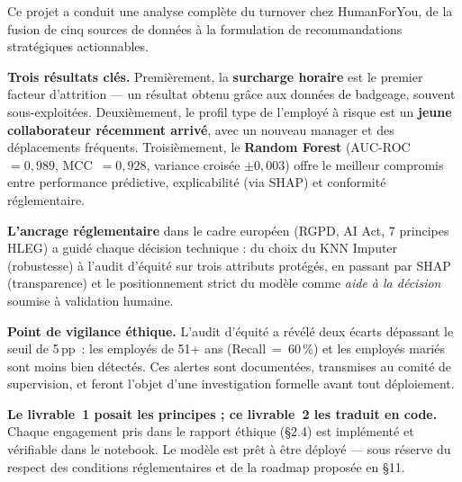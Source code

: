 \documentclass[12pt,a4paper]{article}
\begin{document}
Ce projet a conduit une analyse complète du turnover chez
HumanForYou, de la fusion de cinq sources de données à la
formulation de recommandations stratégiques actionnables.

\textbf{Trois résultats clés.} Premièrement, la \textbf{surcharge
horaire} est le premier facteur d'attrition --- un résultat obtenu
grâce aux données de badgeage, souvent sous-exploitées.
Deuxièmement, le profil type de l'employé à risque est un
\textbf{jeune collaborateur récemment arrivé}, avec un nouveau
manager et des déplacements fréquents. Troisièmement, le
\textbf{Random Forest} (AUC-ROC~$= 0{,}989$, MCC~$= 0{,}928$,
variance croisée $\pm 0{,}003$) offre le meilleur compromis entre
performance prédictive, explicabilité (via SHAP) et conformité
réglementaire.

\textbf{L'ancrage réglementaire} dans le cadre européen (RGPD,
AI Act, 7 principes HLEG) a guidé chaque décision technique :
du choix du KNN Imputer (robustesse) à l'audit d'équité sur trois
attributs protégés, en passant par SHAP (transparence) et le
positionnement strict du modèle comme \textit{aide à la décision}
soumise à validation humaine.

\textbf{Point de vigilance éthique.} L'audit d'équité a révélé
deux écarts dépassant le seuil de 5\,pp~: les employés de 51+ ans
(Recall~=~60\,\%) et les employés mariés sont moins bien détectés.
Ces alertes sont documentées, transmises au comité de supervision,
et feront l'objet d'une investigation formelle avant tout déploiement.

\textbf{Le livrable~1 posait les principes ; ce livrable~2 les
traduit en code.} Chaque engagement pris dans le rapport éthique
(§2.4) est implémenté et vérifiable dans le notebook. Le modèle
est prêt à être déployé --- sous réserve du respect des conditions
réglementaires et de la roadmap proposée en §11.
\end{document}
